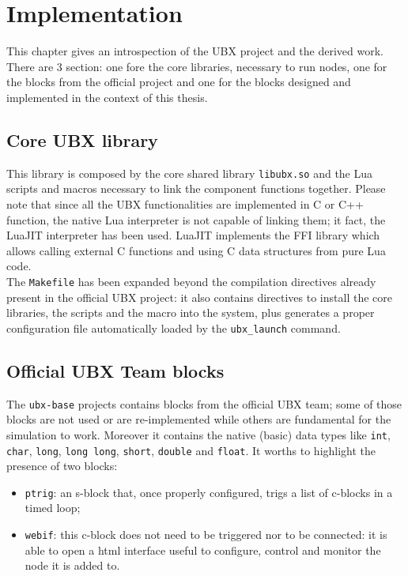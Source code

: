 \chapter{Implementation}
\label{ch:implementation}
This chapter gives an introspection of the UBX project and the derived work. There are 3 section: one fore the core libraries, necessary to run nodes, one for the blocks from the official project and one for the blocks designed and implemented in the context of this thesis.

\section{Core UBX library}
This library is composed by the core shared library \texttt{libubx.so} and the Lua scripts and macros necessary to link the component functions together. Please note that since all the UBX functionalities are implemented in C or C++ function, the native Lua interpreter is not capable of linking them; it fact, the LuaJIT interpreter has been used.
LuaJIT implements the FFI library which allows calling external C functions and using C data structures from pure Lua code\autocite{bib:luaffi}.\\
The \texttt{Makefile} has been expanded beyond the compilation directives already present in the official UBX project: it also contains directives to install the core libraries, the scripts and the macro into the system, plus generates a proper configuration file automatically loaded by the \texttt{ubx\_launch} command.

\section{Official UBX Team blocks}
The \texttt{ubx-base} projects contains blocks from the official UBX team; some of those blocks are not used or are re-implemented while others are fundamental for the simulation to work. Moreover it contains the native (basic) data types like \texttt{int}, \texttt{char}, \texttt{long}, \texttt{long long}, \texttt{short}, \texttt{double} and \texttt{float}.
It worths to highlight the presence of two blocks:
\begin{itemize}
	\item \texttt{ptrig}: an s-block that, once properly configured, trigs a list of c-blocks in a timed loop;
	\item \texttt{webif}: this c-block does not need to be triggered nor to be connected: it is able to open a html interface useful to configure, control and monitor the node it is added to.
\end{itemize}

